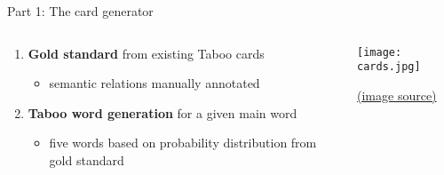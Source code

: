 \documentclass[11pt]{beamer}
\begin{document}
\begin{frame}{Part 1: The card generator}

\begin{columns}
	
	\begin{column}{0.5\textwidth}


	\begin{enumerate}
		\item \textbf{Gold standard} from existing Taboo cards
		\begin{itemize}
			\item semantic relations manually annotated
		\end{itemize}
		\item \textbf{Taboo word generation} for a given main word
		\begin{itemize}
			\item five words based on probability distribution from gold standard
		\end{itemize}
	\end{enumerate}

	\end{column}
	
	\begin{column}{0.5\textwidth}
		
		
		\begin{center}
			\texttt{[image: cards.jpg]}
		\end{center}

		\hfill {\tiny \href{https://www.amazon.com/Hasbro-Gaming-Buzzer-Amazon-Exclusive/dp/B06XYL6Y5C}{(image source)} }
		
	\end{column}


	
\end{columns}

\end{frame}

\end{document}
